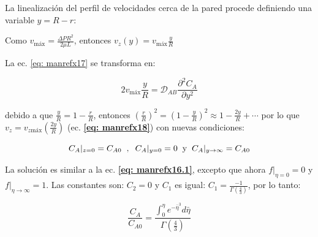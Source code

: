 La linealización del perfil de velocidades cerca de la pared procede definiendo una variable $y = R-r$:

Como $v_{\text{máx}} = \frac{\Delta P R^2}{2 \mu L}$, entonces $v_z (y) = v_{\text{máx}} \frac{y}{R} $

La ec. \eqref{eq: manrefx17} se transforma en:

\begin{equation}
	2 v_{\text{máx}} \frac{y}{R} = \mathscr{D}_{AB} \frac{\partial^2 C_A}{\partial y^2}
\end{equation}

debido a que $\frac{y}{R} = 1 - \frac{r}{R}$, entonces $\left( \frac{r}{R} \right)^2 = \left( 1 - \frac{y}{R} \right)^2 \approx 1 - \frac{2 y}{R} + \cdots$ por lo que $v_z = v_{z \text{máx}} (\frac{2y}{R})$ (ec. \textbf{\eqref{eq: manrefx18}}) con nuevas condiciones:

\begin{equation}
C_A|_{z=0} = C_{A0} \hspace{0.2cm} , \hspace{0.2cm} C_A|_{y=0} = 0 \hspace{0.2cm} \text{y} \hspace{0.2cm} C_A|_{y \to \infty} = C_{A0}
\end{equation}

La solución es similar a la ec. \textbf{\eqref{eq: manrefx16.1}}, excepto que ahora $f|_{\eta = 0} = 0$ y \\ $f|_{\eta \to \infty} = 1$. Las constantes son: $C_2 = 0$ y $C_1$ es igual: $C_1 = \frac{-1}{\Gamma (\frac{4}{3})}$, por lo tanto:

\begin{equation}
	\frac{C_A}{C_{A0}} = \frac{\int_0^\eta e^{- \bar{\eta}^3} d \bar{\eta}}{\Gamma (\frac{4}{3})}
\end{equation}
